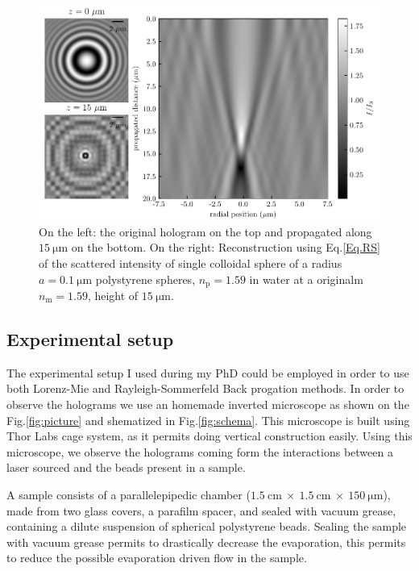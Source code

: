 \begin{figure}[!ht]
	\centering
	\includegraphics{02_body/chapter2/images/Back-propagation/backpropagation.pdf}
	\caption{On the left: the original hologram on the top and propagated along $15 ~ \mathrm{\mu m}$ on the bottom. On the right: Reconstruction using Eq.\ref{Eq.RS} of the scattered intensity of single colloidal sphere of a radius $a = 0.1 ~ \mathrm{\mu m}$  polystyrene spheres, $n_\mathrm{p} = 1.59$ in water at a originalm $n_\mathrm{m} = 1.59$, height of $15 ~ \mathrm{\mu m}$.}
	\label{fig.sommerfeld}
\end{figure}



\subsection{Experimental setup}
\label{chap:exp-setup}

The experimental setup I used during my PhD could be employed in order to use both Lorenz-Mie and Rayleigh-Sommerfeld Back progation methods. In order to observe the holograms we use an homemade inverted microscope as shown on the Fig.\ref{fig:picture} and shematized in Fig.\ref{fig:schema}. This microscope is built using Thor Labs cage system, as it permits doing vertical construction easily. Using this microscope, we observe the holograms coming form the interactions between a laser sourced and the beads present in a sample.

A sample consists of a parallelepipedic chamber ($1.5 ~ \text{cm} ~ \times ~ 1.5 ~ \text{cm} ~ \times ~ 150 ~ \mathrm{\mu m} $), made from two glass covers, a parafilm spacer, and sealed with vacuum grease, containing a dilute suspension of spherical polystyrene beads. Sealing the sample with vacuum grease permits to drastically decrease the evaporation, this permits to reduce the possible evaporation driven flow in the sample.


